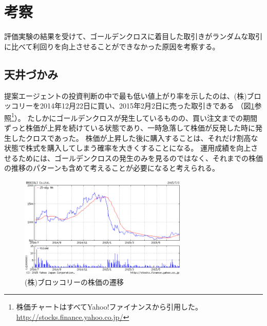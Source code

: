 \documentclass[twocolumn,jsaiac]{jarticle}
\begin{document}
\section{考察}
評価実験の結果を受けて、ゴールデンクロスに着目した取引きがランダムな取引に比べて利回りを向上させることができなかった原因を考察する。

\subsection{天井づかみ}
提案エージェントの投資判断の中で最も低い値上がり率を示したのは、(株)ブロッコリーを2014年12月22日に買い、2015年2月2日に売った取引きである
（図\ref{fig:broccoli}参照\footnote{株価チャートはすべてYahoo!ファイナンスから引用した。\url{http://stocks.finance.yahoo.co.jp/}}）。
たしかにゴールデンクロスが発生しているものの、買い注文までの期間ずっと株価が上昇を続けている状態であり、一時急落して株価が反発した時に発生したクロスであった。
株価が上昇した後に購入することは、それだけ割高な状態で株式を購入してしまう確率を大きくすることになる。
運用成績を向上させるためには、ゴールデンクロスの発生のみを見るのではなく、それまでの株価の推移のパターンも含めて考えることが必要になると考えられる。
\begin{figure}[htb]
\begin{center}
\includegraphics[width=8cm,clip]{broccoli.png}
\end{center}
\caption{(株)ブロッコリーの株価の遷移}
\label{fig:broccoli}
\end{figure}
\end{document}
